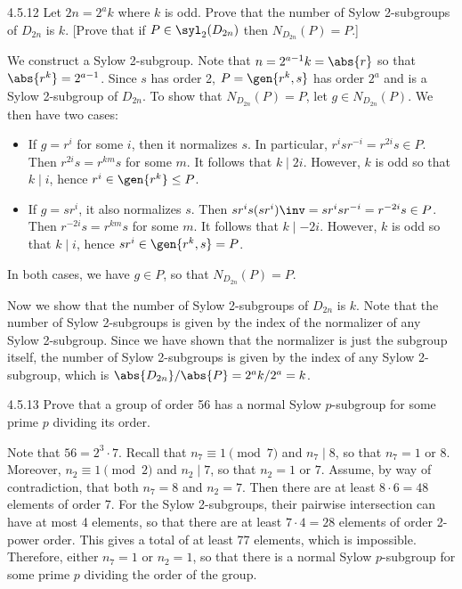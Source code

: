 \begin{exercise}{4.5.12}
	Let $2n = 2^ak$ where $k$ is odd.
	Prove that the number of Sylow 2-subgroups of $D_{2n}$ is $k$. [Prove that if $P \in \syl_2(D_{2n})$ then $N_{D_{2n}}(P) = P$.]
\end{exercise}

\begin{sol}
	We construct a Sylow 2-subgroup.
	Note that $n = 2^{a - 1}k = \abs{r}$ so that $\abs{r^k} = 2^{a - 1}$.
	Since $s$ has order 2, $P = \gen{r^k, s}$ has order $2^a$ and is a Sylow 2-subgroup of $D_{2n}$.
	To show that $N_{D_{2n}}(P) = P$, let $g \in N_{D_{2n}}(P)$.
	We then have two cases:
	\begin{itemize}
		\item If $g = r^i$ for some $i$, then it normalizes $s$.
	In particular, $r^isr^{-i} = r^{2i}s \in P$.
	Then $r^{2i}s = r^{km}s$ for some $m$.
	It follows that $k \mid 2i$.
	However, $k$ is odd so that $k \mid i$, hence $r^i \in \gen{r^k} \leq P$.
		\item If $g = sr^i$, it also normalizes $s$.
	Then $sr^is(sr^i)\inv = sr^isr^{-i} = r^{-2i}s \in P$.
	Then $r^{-2i}s = r^{km}s$ for some $m$.
	It follows that $k \mid -2i$.
	However, $k$ is odd so that $k \mid i$, hence $sr^i \in \gen{r^k, s} = P$.
	\end{itemize}
	In both cases, we have $g \in P$, so that $N_{D_{2n}}(P) = P$.

	Now we show that the number of Sylow 2-subgroups of $D_{2n}$ is $k$.
	Note that the number of Sylow 2-subgroups is given by the index of the normalizer of any Sylow 2-subgroup.
	Since we have shown that the normalizer is just the subgroup itself, the number of Sylow 2-subgroups is given by the index of any Sylow 2-subgroup, which is $\abs{D_{2n}}/\abs{P} = 2^ak/2^a = k$. 
\end{sol}

\begin{exercise}{4.5.13}
	Prove that a group of order 56 has a normal Sylow $p$-subgroup for some prime $p$ dividing its order.
\end{exercise}

\begin{sol}
	Note that $56 = 2^3 \cdot 7$.
	Recall that $n_7 \equiv 1 \pmod 7$ and $n_7 \mid 8$, so that $n_7 = 1$ or $8$.
	Moreover, $n_2 \equiv 1 \pmod 2$ and $n_2 \mid 7$, so that $n_2 = 1$ or $7$.
	Assume, by way of contradiction, that both $n_7 = 8$ and $n_2 = 7$.
	Then there are at least $8 \cdot 6 = 48$ elements of order 7.
	For the Sylow 2-subgroups, their pairwise intersection can have at most 4 elements, so that there are at least $7 \cdot 4 = 28$ elements of order 2-power order.
	This gives a total of at least 77 elements, which is impossible.
	Therefore, either $n_7 = 1$ or $n_2 = 1$, so that there is a normal Sylow $p$-subgroup for some prime $p$ dividing the order of the group.
\end{sol}

